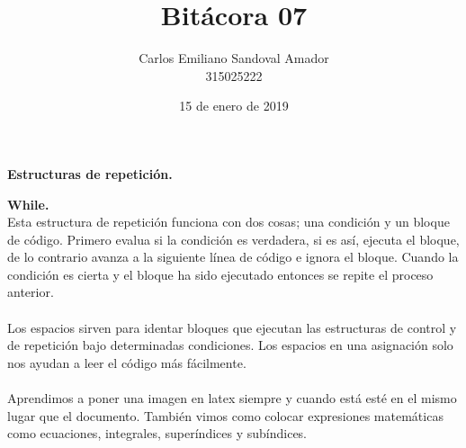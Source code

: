 \documentclass[letterpaper, 12pt, oneside]{article}%
\title{Bitácora 07}
\author{Carlos Emiliano Sandoval Amador \\ 315025222}
\date{15 de enero de 2019}
\begin{document}
	\maketitle
	\begin{center}
		\textbf{\Large Estructuras de repetición.}
	\end{center}
	\textbf{While.} \\ Esta estructura de repetición funciona con dos cosas; una condición y un bloque de código. Primero evalua si la condición es verdadera, si es así, ejecuta el bloque, de lo contrario avanza a la siguiente línea de código e ignora el bloque. Cuando la condición es cierta y el bloque ha sido ejecutado entonces se repite el proceso anterior.  \\ \\ Los espacios sirven para identar bloques que ejecutan las estructuras de control y de repetición bajo determinadas condiciones. Los espacios en una asignación solo nos ayudan a leer el código más fácilmente. \\ \\ Aprendimos a poner una imagen en latex siempre y cuando está esté en el mismo lugar que el documento. También vimos como colocar expresiones matemáticas como ecuaciones, integrales, superíndices y subíndices.
\end{document}
